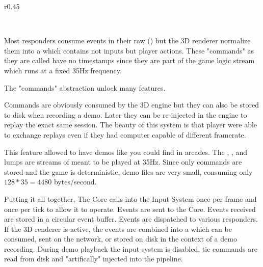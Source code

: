 \begin{wrapfigure}[12]{r}{0.45\textwidth}
\centering
{}
\end{wrapfigure}
\\
\par
Most responders consume events in their raw () but the 3D renderer normalize them into a  which contains not inputs but player actions. These "commands" as they are called have no timestamps since they are part of the game logic stream which runs at a fixed 35Hz frequency. \\
\par
{}
\par
The "commands" abstraction unlock many features. \\
\par
Commands are obviously consumed by the 3D engine but they can also be stored to disk when recording a demo. Later they can be re-injected in the engine to replay the exact same session. The beauty of this system is that player were able to exchange replays even if they had computer capable of different framerate.\\
\par
This feature allowed \doom to have demos like you could find in arcades. The , , and  lumps are streams of  meant to be played at 35Hz. Since only commands are stored and the game is deterministic, demo files are very small, consuming only $ 128 * 35 = 4480 $ bytes/second.\\

\par
Putting it all together,  The Core calls into the Input System once per frame and once per tick to allow it to operate.  Events are sent to the Core.  Events received are stored in a circular event buffer.  Events are dispatched to various responders. If the 3D renderer is active, the events are combined into a  which can be consumed, sent on the network, or stored on disk in the context of a demo recording. During demo playback the input system is disabled, tic commands are read from disk and "artifically" injected into the pipeline.
\par